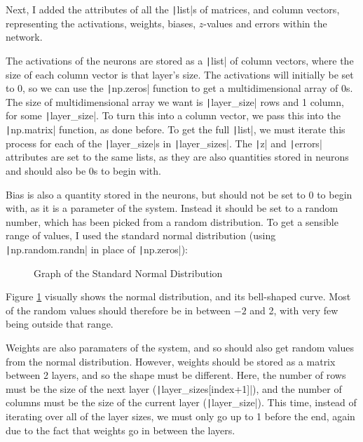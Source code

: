 \documentclass[12pt]{report}
\newcommand{\pil}[1]{\protect\texttt|#1|}
\begin{document}
Next, I added the attributes of all the \pil{list}s of matrices, and column vectors, representing the activations, weights, biases, $z$-values and errors within the network.

The activations of the neurons are stored as a \pil{list} of column vectors, where the size of each column vector is that layer's size. The activations will initially be set to 0, so we can use the \pil{np.zeros} function to get a multidimensional array of 0s. The size of multidimensional array we want is \pil{layer_size} rows and 1 column, for some \pil{layer_size}. To turn this into a column vector, we pass this into the \pil{np.matrix} function, as done before. To get the full \pil{list}, we must iterate this process for each of the \pil{layer_size}s in \pil{layer_sizes}. The \pil{z} and \pil{errors} attributes are set to the same lists, as they are also quantities stored in neurons and should also be 0s to begin with.

Bias is also a quantity stored in the neurons, but should not be set to 0 to begin with, as it is a parameter of the system. Instead it should be set to a random number, which has been picked from a random distribution. To get a sensible range of values, I used the standard normal distribution (using \pil{np.random.randn} in place of \pil{np.zeros}):

\begin{figure}[H]
\centering
{}
\caption{Graph of the Standard Normal Distribution}\label{fig:normalDistribution}
\end{figure}

Figure \ref{fig:normalDistribution} visually shows the normal distribution, and its bell-shaped curve. Most of the random values should therefore be in between $-2$ and 2, with very few being outside that range.

Weights are also paramaters of the system, and so should also get random values from the normal distribution. However, weights should be stored as a matrix between 2 layers, and so the shape must be different. Here, the number of rows must be the size of the next layer (\pil{layer_sizes[index+1]}), and the number of columns must be the size of the current layer (\pil{layer_size}). This time, instead of iterating over all of the layer sizes, we must only go up to 1 before the end, again due to the fact that weights go in between the layers.
\end{document}
